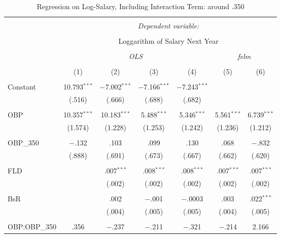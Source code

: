 
\begin{table}[H] \centering
  \caption{Regression on Log-Salary, Including Interaction Term: around .350}
  \label{OBP350_A}
\tiny
\begin{tabular}{@{\extracolsep{5pt}}lcccccc}
\\[-1.8ex]\hline
\hline \\[-1.8ex]
 & \multicolumn{6}{c}{\textit{Dependent variable:}} \\
\cline{2-7}
\\[-1.8ex] & \multicolumn{6}{c}{Loggarithm of Salary Next Year} \\
\\[-1.8ex] & \multicolumn{4}{c}{\textit{OLS}} & \multicolumn{2}{c}{\textit{felm}} \\
\\[-1.8ex] & (1) & (2) & (3) & (4) & (5) & (6)\\
\hline \\[-1.8ex]
 Constant & 10.793$^{***}$ & $-$7.002$^{***}$ & $-$7.166$^{***}$ & $-$7.243$^{***}$ &  &  \\
  & (.516) & (.666) & (.688) & (.682) &  &  \\
  & & & & & & \\
 OBP & 10.357$^{***}$ & 10.183$^{***}$ & 5.488$^{***}$ & 5.346$^{***}$ & 5.561$^{***}$ & 6.739$^{***}$ \\
  & (1.574) & (1.228) & (1.253) & (1.242) & (1.236) & (1.212) \\
  & & & & & & \\
 OBP\_350 & $-$.132 & .103 & .099 & .130 & .068 & $-$.832 \\
  & (.888) & (.691) & (.673) & (.667) & (.662) & (.620) \\
  & & & & & & \\
 FLD &  & .007$^{***}$ & .008$^{***}$ & .008$^{***}$ & .007$^{***}$ & .007$^{***}$ \\
  &  & (.002) & (.002) & (.002) & (.002) & (.002) \\
  & & & & & & \\
 BsR &  & .002 & $-$.001 & $-$.0003 & .003 & .022$^{***}$ \\
  &  & (.004) & (.005) & (.005) & (.004) & (.005) \\
  & & & & & & \\
 OBP:OBP\_350 & .356 & $-$.237 & $-$.211 & $-$.321 & $-$.214 & 2.166 \\

\end{tabular}
\end{table}
